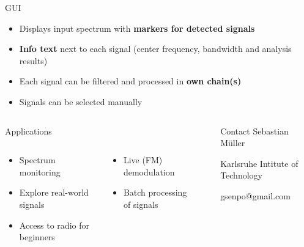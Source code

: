 \documentclass{beamer}
\begin{document}
\begin{frame}
\begin{columns}[t]
\begin{column}{0.66\textwidth}
\begin{block}{GUI}
\begin{figure}
      \end{figure}
      \begin{itemize}
        \item Displays input spectrum with \textbf{markers for detected signals}
        \item \textbf{Info text} next to each signal (center frequency, bandwidth and analysis results)
        \item Each signal can be filtered and processed in \textbf{own chain(s)}
        \item Signals can be selected manually
      \end{itemize}
      \end{block}
    \end{column}
  \end{columns}
  \begin{columns}[t]
  	\begin{column}{0.66\textwidth}
  		\begin{block}{Applications}
  			\begin{columns}
        \begin{column}{0.45\textwidth}
        \begin{itemize}
          \item Spectrum monitoring
          \item Explore real-world signals
          \item Access to radio for beginners
        \end{itemize}
        \end{column}
        \begin{column}{0.45\textwidth}
         \begin{itemize}
          \item Live (FM) demodulation
          \item Batch processing of signals
        \end{itemize}
        \end{column}
        \end{columns}
  		\end{block}
  	\end{column}
  	\begin{column}{0.01\textwidth}
  	\end{column}
  	\begin{column}{0.33\textwidth}
  		\begin{block}{Contact}
  			Sebastian Müller

  			Karlsruhe Intitute of Technology

  			gsenpo@gmail.com
  			\vspace{0.3em}
  		\end{block}
  	\end{column}
  \end{columns}
\end{frame}
\end{document}
